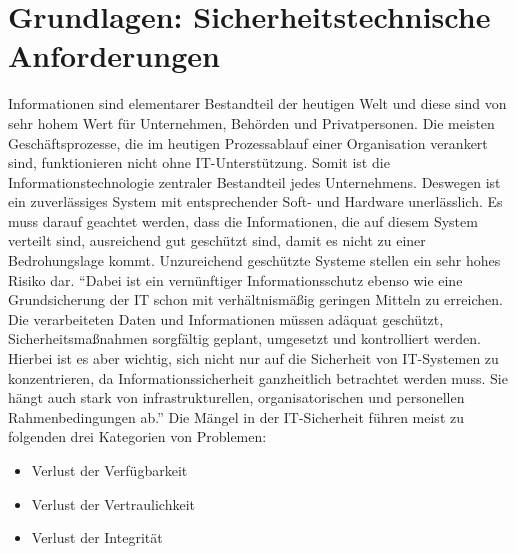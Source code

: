 \section{Grundlagen: Sicherheitstechnische Anforderungen}\label{kap:sicherheitstechnischeAnforderungen}
Informationen sind elementarer Bestandteil der heutigen Welt und diese sind von sehr hohem Wert für Unternehmen, Behörden und Privatpersonen. Die meisten Geschäftsprozesse, die im heutigen Prozessablauf einer Organisation verankert sind, funktionieren nicht ohne IT-Unterstützung. Somit ist die Informationstechnologie zentraler Bestandteil jedes Unternehmens. Deswegen ist ein zuverlässiges System mit entsprechender Soft- und Hardware unerlässlich. Es muss darauf geachtet werden, dass die Informationen, die auf diesem System verteilt sind, ausreichend gut geschützt sind, damit es nicht zu einer Bedrohungslage kommt. Unzureichend geschützte Systeme stellen ein sehr hohes Risiko dar. \enquote{Dabei ist ein vernünftiger Informationsschutz ebenso wie eine Grundsicherung der IT schon mit verhältnismäßig geringen Mitteln zu erreichen. Die verarbeiteten Daten und Informationen müssen adäquat geschützt, Sicherheitsmaßnahmen sorgfältig geplant, umgesetzt und kontrolliert werden. Hierbei ist es aber wichtig, sich nicht nur auf die Sicherheit von IT-Systemen zu konzentrieren, da Informationssicherheit ganzheitlich betrachtet werden muss. Sie	hängt auch stark von infrastrukturellen, organisatorischen und personellen Rahmenbedingungen ab.}\autocite[][S.\,1]{bundesamt_fur_sicherheit_in_der_informationstechnik_bsi_it-grundschutz-kompendium_2020} Die Mängel in der IT-Sicherheit führen meist zu folgenden drei Kategorien von Problemen\autocite[vgl.][S.\,1ff.]{bundesamt_fur_sicherheit_in_der_informationstechnik_bsi_it-grundschutz-kompendium_2020}: 

\begin{itemize}
	\item Verlust der Verfügbarkeit
	\item Verlust der Vertraulichkeit
	\item Verlust der Integrität
\end{itemize}

